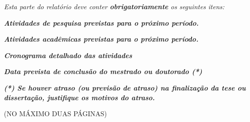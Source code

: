 \documentclass[12pt,a4paper]{article}
\begin{document}
\textit{Esta parte do relatório deve conter \textbf{obrigatoriamente}
os seguintes itens:}

\bigskip

\bigskip

{\centering\bfseries\itshape
Atividades de pesquisa previstas para o próximo período.
\par}

\bigskip

{\centering\bfseries\itshape
Atividades acadêmicas previstas para o próximo período.
\par}

\bigskip

{\centering\bfseries\itshape
Cronograma detalhado das atividades
\par}

\bigskip

{\centering\bfseries\itshape
Data prevista de conclusão do mestrado ou doutorado (*)
\par}

\bigskip

\bigskip

{\centering\bfseries\itshape
(*) Se houver atraso (ou previsão de atraso) na finalização da tese ou
dissertação, justifique os motivos do atraso.
\par}

\bigskip
\bigskip

{\centering
(NO MÁXIMO DUAS PÁGINAS)
\par}
\end{document}
